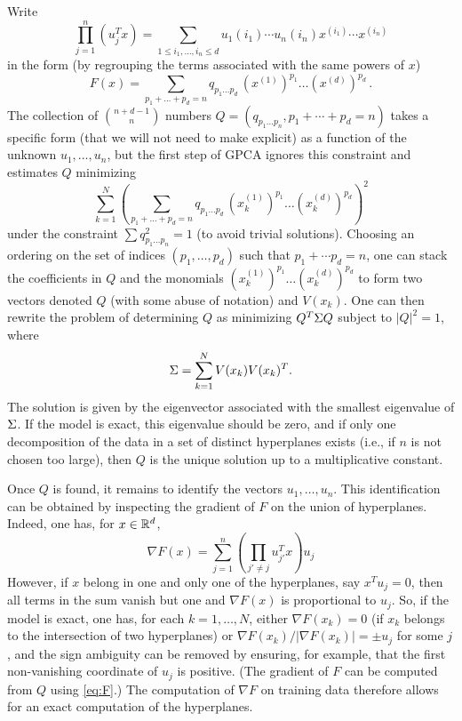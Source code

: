 Write
$$
\prod_{j=1}^n (u^T_j x) = \sum_{1\leq i_1, \ldots,  i_n \leq
d} u_1(i_1) \cdots u_n(i_n) x^{(i_1)}\cdots x^{(i_n)}
$$
in the form (by regrouping the terms associated with the same powers of $x$)
\begin{equation}
\label{eq:F}
F(x) = \sum_{p_1 + \ldots + p_d = n} q_{p_1\ldots p_d}\,  (x^{(1)})^{p_1} \ldots
(x^{(d)})^{p_d}\,.
\end{equation}
The collection of $\binom{n+d-1}{n}$ numbers $ Q = (q_{p_1\ldots p_n}, p_1 + \cdots + p_d = n)$ takes a specific form (that we will not need to make explicit) as a function of the unknown $u_1, \ldots, u_n$, but the first step of GPCA ignores this constraint and estimates $Q$ minimizing 
$$
\sum_{k=1}^N \left(\sum_{p_1 + \ldots + p_d = n} q_{p_1\ldots p_d} \,  (x_k^{(1)})^{p_1} \ldots
(x_k^{(d)})^{p_d}\right)^2
$$
under the constraint $\sum q_{p_1 \ldots p_n}^2 = 1$ (to avoid trivial solutions). Choosing an ordering on the set of indices $(p_1, \ldots,p_d)$ such that $p_1+ \cdots p_d=n$, one can stack the coefficients in $Q$ and the monomials $ (x_k^{(1)})^{p_1} \ldots
(x_k^{(d)})^{p_d}$ to form two vectors denoted $Q$ (with some abuse of notation) and $V(x_k)$. One can then rewrite the problem of determining $Q$ as minimizing $Q^T\Sigma Q$ subject to $|Q|^2 = 1$, where 
\[
\Sigma = \sum_{k=1}^N V(x_k)V(x_k)^T.
\]
The solution is given by the eigenvector associated with the smallest eigenvalue of $\Sigma$. If the model is exact, this eigenvalue should be zero, and if only one decomposition of the data in a set of distinct hyperplanes exists (i.e., if $n$ is not chosen too large), then $Q$ is the unique solution up to a multiplicative constant. 

Once $Q$ is found, it remains to identify the vectors $u_1, \ldots, u_n$. This identification can be obtained by inspecting the gradient of $F$ on the union of hyperplanes. Indeed, one has, for $x\in {\mathbb{R}}^d$,
\[
\nabla F(x) = \sum_{j=1}^n\left(\prod_{j'\neq j} u_{j'}^Tx\right) u_j
\]
However, if $x$ belong in one and only one of the hyperplanes, say $x^Tu_j = 0$, then all terms in the sum vanish but one and $\nabla F(x)$ is proportional to $u_j$. So, if the model is exact, one has, for each $k=1, \ldots, N$, either $\nabla F(x_k) = 0$ (if $x_k$ belongs to the intersection of two hyperplanes) or $\nabla F(x_k)/|\nabla F(x_k)| = \pm u_j$ for some $j$, and the sign ambiguity can be removed by ensuring, for example, that the first non-vanishing coordinate of  $u_j$ is positive. (The gradient of $F$ can be computed from $Q$ using \cref{eq:F}.) The computation of $\nabla F$ on training data therefore allows for an exact computation of the hyperplanes.


